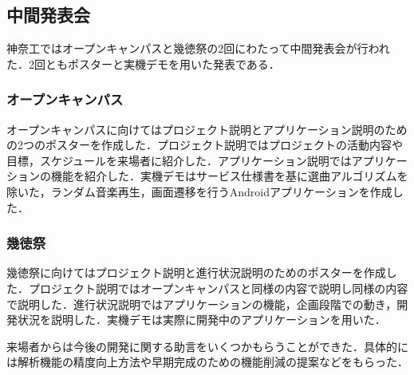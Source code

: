 \subsection{中間発表会}
\par 神奈工ではオープンキャンパスと幾徳祭の2回にわたって中間発表会が行われた．2回ともポスターと実機デモを用いた発表である．

\subsubsection{オープンキャンパス}
\par オープンキャンパスに向けてはプロジェクト説明とアプリケーション説明のための2つのポスターを作成した．プロジェクト説明ではプロジェクトの活動内容や目標，スケジュールを来場者に紹介した．アプリケーション説明ではアプリケーションの機能を紹介した．実機デモはサービス仕様書を基に選曲アルゴリズムを除いた，ランダム音楽再生，画面遷移を行うAndroidアプリケーションを作成した．

\subsubsection{幾徳祭}
\par 幾徳祭に向けてはプロジェクト説明と進行状況説明のためのポスターを作成した．プロジェクト説明ではオープンキャンパスと同様の内容で説明し同様の内容で説明した．進行状況説明ではアプリケーションの機能，企画段階での動き，開発状況を説明した．実機デモは実際に開発中のアプリケーションを用いた．

\par 来場者からは今後の開発に関する助言をいくつかもらうことができた．具体的には解析機能の精度向上方法や早期完成のための機能削減の提案などをもらった．

